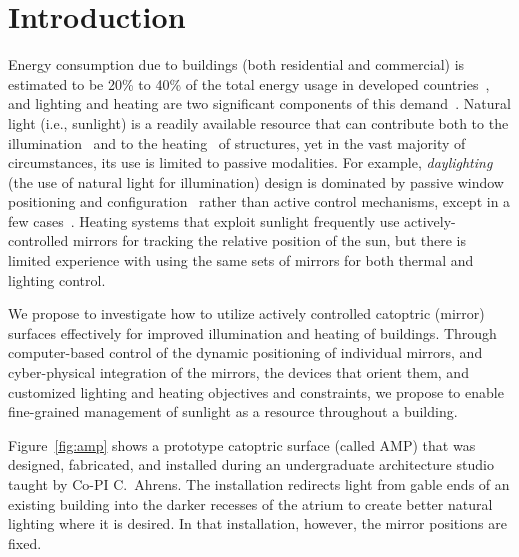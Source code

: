 \section{Introduction}
\label{sec:intro}

Energy consumption due to buildings (both residential and commercial)
is estimated to be 20\% to 40\% of the total energy usage in
developed countries~\cite{pop08}, and
lighting and heating are two significant components of this demand~\cite{keh05}.
Natural light (i.e., sunlight) is a readily available resource that
can contribute both to the illumination~\cite{Leslie03}
and to the heating~\cite{Lunde80} of structures,
yet in the vast majority of circumstances, its use is limited to
passive modalities.  For example, \emph{daylighting} (the use of natural
light for illumination) design is dominated by passive window positioning
and configuration~\cite{vgf+13} rather than active control mechanisms,
except in a few cases~\cite{kt16}.
Heating systems that exploit sunlight frequently use actively-controlled mirrors
for tracking the relative position of the sun, but there is limited experience
with using the same sets of mirrors for both thermal and lighting control.

We propose to investigate how to utilize actively
controlled catoptric (mirror) surfaces effectively for improved illumination and
heating of buildings.  Through computer-based control of the dynamic positioning of
individual mirrors, and cyber-physical integration of the mirrors, the devices
that orient them, and customized lighting and heating objectives and constraints,
we propose to enable fine-grained management of sunlight as a resource throughout
a building.

Figure~\ref{fig:amp} shows a prototype catoptric surface (called AMP) that was 
designed, fabricated, and installed during an undergraduate architecture studio 
taught by Co-PI C.~Ahrens. The installation redirects light from gable ends of an 
existing building into the darker recesses of the atrium to create better natural 
lighting where it is desired. In that installation, however, the mirror positions 
are fixed.

